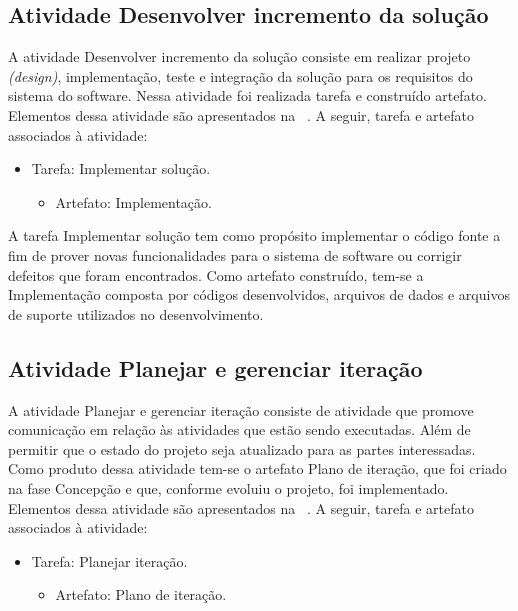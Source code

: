 \subsection{Atividade Desenvolver incremento da solução}

%

A atividade Desenvolver incremento da solução consiste em realizar projeto \emph{(design)}, implementação, teste e integração da solução para os requisitos do sistema do software.  Nessa atividade foi realizada tarefa e construído artefato. Elementos dessa atividade são apresentados na ~. A seguir, tarefa e artefato associados à atividade:

\begin{itemize}
    \item Tarefa: Implementar solução.
    \begin{itemize}
        \item Artefato: Implementação.
    \end{itemize}
\end{itemize}

A tarefa Implementar solução tem como propósito implementar o código fonte a fim de prover novas funcionalidades para o sistema de software ou corrigir defeitos que foram encontrados. Como artefato construído, tem-se a Implementação composta por códigos desenvolvidos, arquivos de dados e arquivos de suporte utilizados no desenvolvimento.

\subsection{Atividade Planejar e gerenciar iteração}


A atividade Planejar e gerenciar iteração consiste de atividade que promove comunicação em relação às atividades que estão sendo executadas. Além de permitir que o estado do projeto seja atualizado para as partes interessadas. Como produto dessa atividade tem-se o artefato Plano de iteração, que foi criado na fase Concepção e que, conforme evoluiu o projeto, foi implementado. 
Elementos dessa atividade são apresentados na ~. A seguir, tarefa e artefato associados à atividade:


\begin{itemize}
    \item Tarefa: Planejar iteração.
    \begin{itemize}
        \item Artefato: Plano de iteração.
    \end{itemize}
\end{itemize}


